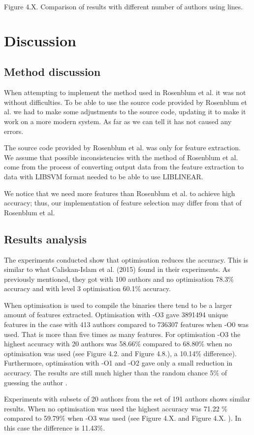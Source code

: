 \documentclass[a4paper,11pt]{kth-mag}
\begin{document}
Figure 4.X. Comparison of results with different number of authors using lines.


\chapter{Discussion}
\section{Method discussion}
When attempting to implement the method used in Rosenblum et al. it was not
without difficulties. To be able to use the source code provided by Rosenblum
et al. we had to make some adjustments to the source code, updating it to make
it work on a more modern system. As far as we can tell it has not caused any
errors.

The source code provided by Rosenblum et al. was only for feature extraction.
We assume that possible inconsistencies with the method of Rosenblum et al.
come from the process of converting output data from the feature extraction to
data with LIBSVM format needed to be able to use LIBLINEAR.

We notice that we need more features than Rosenblum et al. to achieve high
accuracy; thus, our implementation of feature selection may differ from that of
Rosenblum et al. 

\section{Results analysis}
The experiments conducted show that optimisation reduces the accuracy. This is
similar to what Caliskan-Islam et al. (2015) found in their experiments. As
previously mentioned, they got with 100 authors and no optimisation 78.3\%
accuracy and with level 3 optimisation 60.1\% accuracy.

When optimisation is used to compile the binaries there tend to be a larger
amount of features extracted. Optimisation with -O3 gave 3891494 unique
features in the case with 413 authors compared to 736307 features when -O0 was
used. That is more than five times as many features. For optimisation -O3  the
highest accuracy with 20 authors was 58.66\% compared to 68.80\% when no
optimisation was used (see Figure 4.2. and Figure 4.8.), a 10.14\% difference).
Furthermore, optimisation with -O1 and -O2 gave only a small reduction in
accuracy. The results are still much higher than the random chance 5\% of
guessing the author . 

Experiments with subsets of 20 authors from the set of 191 authors shows
similar results. When no optimisation was used the highest accuracy was 71.22
\% compared to 59.79\% when -O3 was used (see Figure 4.X. and  Figure 4.X. ).
In this case the difference is 11.43\%.
\end{document}
